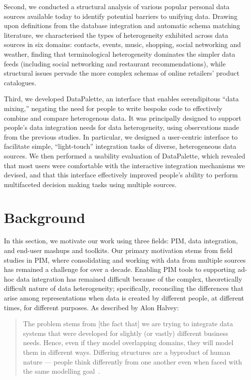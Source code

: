 \documentclass{sigchi}
\begin{document}
Second, we conducted a structural analysis of various popular personal data sources available today to identify potential barriers to unifying data.  Drawing upon definitions from the database integration and automatic schema matching literature, we characterised the types of heterogeneity exhibited across data sources in six domains: contacts, events, music, shopping, social networking and weather, finding that terminological heterogeneity dominates the simpler data feeds (including social networking and restaurant recommendations), while structural issues pervade the more complex schemas of online retailers' product catalogues.


Third, we developed DataPalette, an interface that enables serendipitous ``data mixing,'' negating the need for people to write bespoke code to effectively combine and compare heterogenous data.  It was principally designed to support people's data integration needs for data heterogeneity, using observations made from the previous studies.  In particular, we designed a user-centric interface to facilitate simple, ``light-touch'' integration tasks of diverse, heterogeneous data sources.  We then performed a usability evaluation of DataPalette, which revealed that most users were comfortable with the interactive integration mechanisms we devised, and that this interface effectively improved people's ability to perform multifaceted decision making tasks using multiple sources.

\section{Background}

In this section, we motivate our work using three fields: PIM, data integration, and end-user mashups and toolkits.  Our primary motivation stems from field studies in PIM, where consolidating and working with data from multiple sources has remained a challenge for over a decade. Enabling PIM tools to supporting ad-hoc data integration has remained difficult because of the complex, theoretically difficult nature of data heterogeneity; specifically, reconciling the differences that arise among representations when data is created by different people, at different times, for different purposes. As described by Alon Halvey:

\begin{quote} 
  The problem stems from [the fact that] we are trying to integrate data systems that were developed for slightly (or vastly) different business needs. Hence, even if they model overlapping domains, they will model them in different ways. Differing structures are a byproduct of human nature --- people think differently from one another even when faced with the same modelling goal~\cite{alonhalevy}.
\end{quote}
\end{document}
